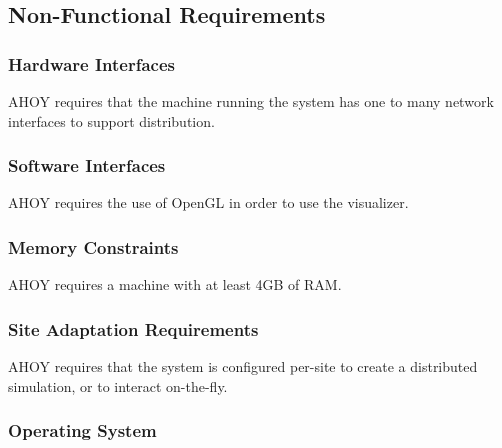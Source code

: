\documentclass[titlepage]{article}
\begin{document}

\subsection{Non-Functional Requirements} 

\subsubsection{Hardware Interfaces%
  \label{hardware-interfaces}%
}

AHOY requires that the machine running the system has one to many network interfaces to support distribution.


\subsubsection{Software Interfaces%
  \label{software-interfaces}%
}

AHOY requires the use of OpenGL in order to use the visualizer.


\subsubsection{Memory Constraints%
  \label{memory-constraints}%
}

AHOY requires a machine with at least 4GB of RAM.


\subsubsection{Site Adaptation Requirements%
  \label{site-adaptation-requirements}%
}

AHOY requires that the system is configured per-site to create a distributed simulation, or to interact on-the-fly.


\subsubsection{Operating System%
  \label{operating-system}%
}
\end{document}
